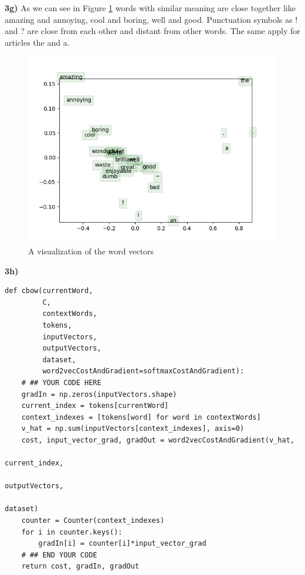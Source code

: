 \documentclass{article}
\begin{document}
\pagebreak

\textbf{3g)} As we can see in Figure \ref{word_vectors} words with similar meaning are close together like amazing and annoying, cool and boring, well and good. Punctuation symbols as ! and ? are close from each other and distant from other words. The same apply for articles the and a.  \\

\begin{figure}
\begin{center}
\includegraphics[scale=0.85]{q3_word_vectors.png}
\end{center}
\caption{A visualization of the word vectors}
\label{word_vectors}
\end{figure}

\textbf{3h)}
\begin{verbatim}
def cbow(currentWord,
         C,
         contextWords,
         tokens,
         inputVectors,
         outputVectors,
         dataset,
         word2vecCostAndGradient=softmaxCostAndGradient):
    # ## YOUR CODE HERE
    gradIn = np.zeros(inputVectors.shape)
    current_index = tokens[currentWord]
    context_indexes = [tokens[word] for word in contextWords]
    v_hat = np.sum(inputVectors[context_indexes], axis=0)
    cost, input_vector_grad, gradOut = word2vecCostAndGradient(v_hat,
                                                               current_index,
                                                               outputVectors,
                                                               dataset)
    counter = Counter(context_indexes)
    for i in counter.keys():
        gradIn[i] = counter[i]*input_vector_grad
    # ## END YOUR CODE
    return cost, gradIn, gradOut
\end{verbatim}
\end{document}
